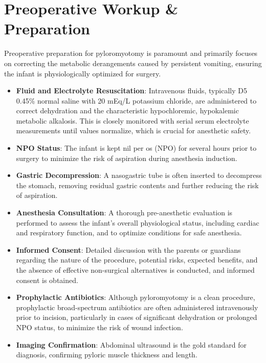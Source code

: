 \section*{Preoperative Workup \& Preparation}
Preoperative preparation for pyloromyotomy is paramount and primarily focuses on correcting the metabolic derangements caused by persistent vomiting, ensuring the infant is physiologically optimized for surgery.

\begin{itemize}
  \item \textbf{Fluid and Electrolyte Resuscitation}: Intravenous fluids, typically D5 0.45\% normal saline with 20 mEq/L potassium chloride, are administered to correct dehydration and the characteristic hypochloremic, hypokalemic metabolic alkalosis. This is closely monitored with serial serum electrolyte measurements until values normalize, which is crucial for anesthetic safety.
  \item \textbf{NPO Status}: The infant is kept nil per os (NPO) for several hours prior to surgery to minimize the risk of aspiration during anesthesia induction.
  \item \textbf{Gastric Decompression}: A nasogastric tube is often inserted to decompress the stomach, removing residual gastric contents and further reducing the risk of aspiration.
  \item \textbf{Anesthesia Consultation}: A thorough pre-anesthetic evaluation is performed to assess the infant's overall physiological status, including cardiac and respiratory function, and to optimize conditions for safe anesthesia.
  \item \textbf{Informed Consent}: Detailed discussion with the parents or guardians regarding the nature of the procedure, potential risks, expected benefits, and the absence of effective non-surgical alternatives is conducted, and informed consent is obtained.
  \item \textbf{Prophylactic Antibiotics}: Although pyloromyotomy is a clean procedure, prophylactic broad-spectrum antibiotics are often administered intravenously prior to incision, particularly in cases of significant dehydration or prolonged NPO status, to minimize the risk of wound infection.
  \item \textbf{Imaging Confirmation}: Abdominal ultrasound is the gold standard for diagnosis, confirming pyloric muscle thickness and length.
\end{itemize}

